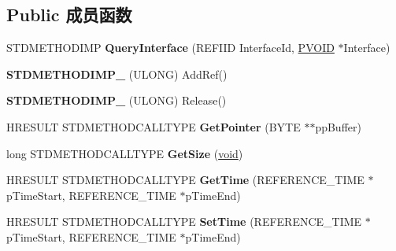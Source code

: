 \subsection*{Public 成员函数}
\begin{DoxyCompactItemize}
\item 
\mbox{\label{class_c_media_sample_aa6413909e00fe4a391196c6cdab423e2}} 
S\+T\+D\+M\+E\+T\+H\+O\+D\+I\+MP {\bfseries Query\+Interface} (R\+E\+F\+I\+ID Interface\+Id, \hyperlink{interfacevoid}{P\+V\+O\+ID} $\ast$Interface)
\item 
\mbox{\label{class_c_media_sample_a3a07a7b0136e8d47227db47becf8ba72}} 
{\bfseries S\+T\+D\+M\+E\+T\+H\+O\+D\+I\+M\+P\+\_\+} (U\+L\+O\+NG) Add\+Ref()
\item 
\mbox{\label{class_c_media_sample_a0a1aeabe635d0f0e2669b36f44a48dae}} 
{\bfseries S\+T\+D\+M\+E\+T\+H\+O\+D\+I\+M\+P\+\_\+} (U\+L\+O\+NG) Release()
\item 
\mbox{\label{class_c_media_sample_a67fb42134885d2ff470772f8a92ca7dd}} 
H\+R\+E\+S\+U\+LT S\+T\+D\+M\+E\+T\+H\+O\+D\+C\+A\+L\+L\+T\+Y\+PE {\bfseries Get\+Pointer} (B\+Y\+TE $\ast$$\ast$pp\+Buffer)
\item 
\mbox{\label{class_c_media_sample_a54447fb939c3bfff88a6f42bb16bbc02}} 
long S\+T\+D\+M\+E\+T\+H\+O\+D\+C\+A\+L\+L\+T\+Y\+PE {\bfseries Get\+Size} (\hyperlink{interfacevoid}{void})
\item 
\mbox{\label{class_c_media_sample_a18b6e419d426c652093fd2d551c2664e}} 
H\+R\+E\+S\+U\+LT S\+T\+D\+M\+E\+T\+H\+O\+D\+C\+A\+L\+L\+T\+Y\+PE {\bfseries Get\+Time} (R\+E\+F\+E\+R\+E\+N\+C\+E\+\_\+\+T\+I\+ME $\ast$p\+Time\+Start, R\+E\+F\+E\+R\+E\+N\+C\+E\+\_\+\+T\+I\+ME $\ast$p\+Time\+End)
\item 
\mbox{\label{class_c_media_sample_a8ffd37800748fc29c281dc17c96e0543}} 
H\+R\+E\+S\+U\+LT S\+T\+D\+M\+E\+T\+H\+O\+D\+C\+A\+L\+L\+T\+Y\+PE {\bfseries Set\+Time} (R\+E\+F\+E\+R\+E\+N\+C\+E\+\_\+\+T\+I\+ME $\ast$p\+Time\+Start, R\+E\+F\+E\+R\+E\+N\+C\+E\+\_\+\+T\+I\+ME $\ast$p\+Time\+End)
\item 
\mbox{\label{class_c_media_sample_a26c3f57f62299e47464370804a15f5cd}} 
$$
\end{DoxyCompactItemize}

